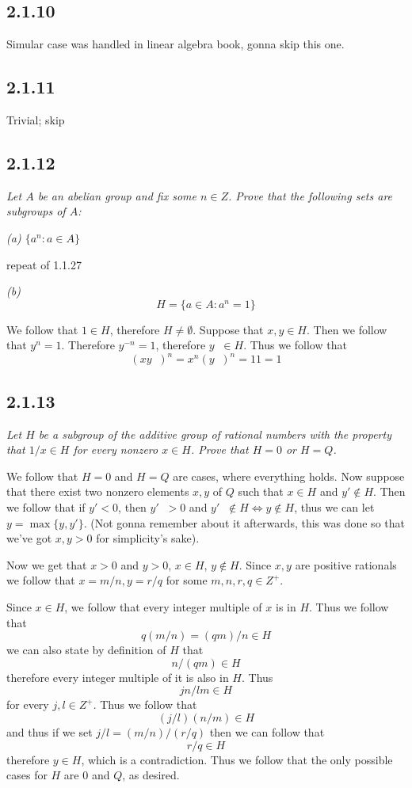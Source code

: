 \documentclass[11pt,oneside,titlepage]{book}
\DeclareMathOperator \inv {^{-1}}
\begin{document}
\subsection*{2.1.10}

Simular case was handled in linear algebra book, gonna skip this one.

\subsection*{2.1.11}

Trivial; skip

\subsection*{2.1.12}

\textit{Let $A$ be an abelian group and fix some $n \in Z$. Prove that the following sets are
  subgroups of $A$:}

\textit{(a) $\{a^n: a \in A\}$}

repeat of 1.1.27

\textit{(b) $$H = \{a \in A: a^n = 1\}$$}

We follow that $1 \in H$, therefore $H \neq \emptyset$. Suppose that $x, y \in H$. Then we
follow that $y^n = 1$. Therefore $y^{-n} = 1$, therefore $y\inv \in H$.
Thus we follow that
$$(xy\inv)^n = x^n (y\inv)^n = 11 = 1$$


\subsection*{2.1.13}

\textit{Let $H$ be a subgroup of the additive group of rational numbers with the property
  that $1/x \in H$ for every nonzero $x \in H$. Prove that $H = 0$ or $H = Q$.}

We follow that $H = 0$ and $H = Q$ are cases, where everything holds. Now suppose that
there exist two nonzero elements $x, y$ of $Q$ such that $x \in H$ and $y' \notin H$.
Then we follow that if $y' < 0$, then $y'\inv > 0$ and $y'\inv \notin H \iff y \notin H$,
thus we can let $y = \max\{y, y'\}$. (Not gonna remember about it afterwards, this was
done so that we've got $x, y > 0$ for simplicity's sake).

Now we get that $x > 0$ and $y > 0$, $x \in H$, $y \notin H$. Since $x, y$ are
positive rationals we follow that $x = m/n, y = r/q$ for some $m, n, r, q \in Z^+$.

Since $x \in H$, we follow that every integer multiple of $x$ is in $H$. Thus we follow that
$$q(m/n) = (qm)/n \in H$$
we can also state by definition of $H$ that
$$n/(qm) \in H$$
therefore every integer multiple of it is also in $H$. Thus
$$jn/lm \in H$$
for every $j, l \in Z^+$. Thus we follow that
$$(j/l)(n/m)  \in H$$
and thus if we set $j/l =  (m/n) / (r/q)$
then we can follow that
$$r/q \in H$$
therefore $y\in H$, which is a contradiction. Thus we follow that the only possible cases for
$H$ are $0$ and $Q$, as desired.
\end{document}
